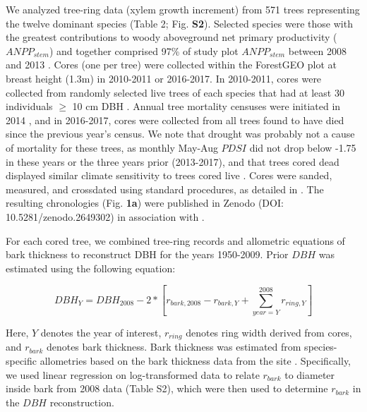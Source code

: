 \documentclass[
]{article}
\begin{document}
We analyzed tree-ring data (xylem growth increment) from 571 trees
representing the twelve dominant species (Table 2; Fig. \textbf{S2}).
Selected species were those with the greatest contributions to woody
aboveground net primary productivity (\(ANPP_{stem}\)) and together
comprised 97\% of study plot \(ANPP_{stem}\) between 2008 and 2013
\citep{helcoski_growing_2019}. Cores (one per tree) were collected
within the ForestGEO plot at breast height (1.3m) in 2010-2011 or
2016-2017. In 2010-2011, cores were collected from randomly selected
live trees of each species that had at least 30 individuals \(\ge\) 10
cm DBH \citep{bourg_initial_2013}. Annual tree mortality censuses were
initiated in 2014 \citep{gonzalezakre_patterns_2016}, and in 2016-2017,
cores were collected from all trees found to have died since the
previous year's census. We note that drought was probably not a cause of
mortality for these trees, as monthly May-Aug \(PDSI\) did not drop
below -1.75 in these years or the three years prior (2013-2017), and
that trees cored dead displayed similar climate sensitivity to trees
cored live \citep{helcoski_growing_2019}. Cores were sanded, measured,
and crossdated using standard procedures, as detailed in
\citep{helcoski_growing_2019}. The resulting chronologies (Fig.
\textbf{1a}) were published in Zenodo (DOI: 10.5281/zenodo.2649302) in
association with \citet{helcoski_growing_2019}.

For each cored tree, we combined tree-ring records and allometric
equations of bark thickness to reconstruct DBH for the years 1950-2009.
Prior \(DBH\) was estimated using the following equation:

\[DBH_Y  = DBH_{2008} - 2*\left[r_{bark,2008} - r_{bark,Y} + \sum_{year=Y}^{2008} r_{ring, Y} \right]\]

Here, \(Y\) denotes the year of interest, \(r_{ring}\) denotes ring
width derived from cores, and \(r_{bark}\) denotes bark thickness. Bark
thickness was estimated from species-specific allometries based on the
bark thickness data from the site
\citep{andersonteixeira_size-related_2015}. Specifically, we used linear
regression on log-transformed data to relate \(r_{bark}\) to diameter
inside bark from 2008 data (Table S2), which were then used to determine
\(r_{bark}\) in the \(DBH\) reconstruction.
\end{document}
